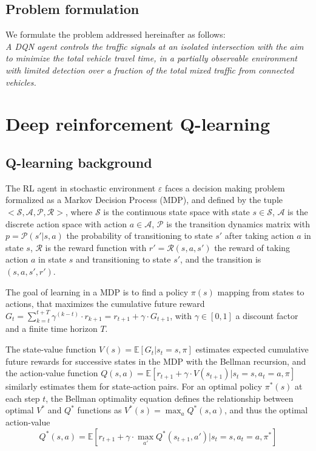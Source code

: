 \documentclass[journal]{IEEEtran}
\begin{document}
\subsection{Problem formulation}
We formulate the problem addressed hereinafter as follows: \\
\textit{A DQN agent controls the traffic signals at an isolated intersection with the aim to minimize the total vehicle travel time, in a partially observable environment with limited detection over a fraction of the total mixed traffic from connected vehicles.}

\section{Deep reinforcement Q-learning}
\label{sec:dqn}

\subsection{Q-learning background}
The RL agent in stochastic environment $\varepsilon$ faces a decision making problem formalized as a Markov Decision Process (MDP), and defined by the tuple $<\mathcal{S},\mathcal{A},\mathcal{P},\mathcal{R}>$, where $\mathcal{S}$ is the continuous state space with state $s \in \mathcal{S}$, $\mathcal{A}$ is the discrete action space with action $a \in \mathcal{A}$, $\mathcal{P}$ is the transition dynamics matrix with $p=\mathcal{P}(s'|s,a)$ the probability of transitioning to state $s'$ after taking action $a$ in state $s$, $\mathcal{R}$ is the reward function with $r'=\mathcal{R}(s,a,s')$ the reward of taking action $a$ in state $s$ and transitioning to state $s'$, and the transition is $(s,a,s',r')$.

The goal of learning in a MDP is to find a policy $\pi(s)$ mapping from states to actions, that maximizes the cumulative future reward $G_t = \sum_{k=t}^{t+T} \gamma^{(k-t)} \cdot r_{k+1} = r_{t+1} + \gamma \cdot G_{t+1}$, with $\gamma \in [0,1]$ a discount factor and a finite time horizon $T$.
    
The state-value function $V(s) = \mathbb{E}[G_{t} |s_t=s, \pi]$ estimates expected cumulative future rewards for successive states in the MDP with the Bellman recursion, and the action-value function $Q(s,a)= \mathbb{E}[r_{t+1} + \gamma \cdot V(s_{t+1}) |s_t=s, a_t=a, \pi]$ similarly estimates them for state-action pairs. For an optimal policy $\pi^*(s)$ at each step $t$, the Bellman optimality equation defines the relationship between optimal $V^*$ and $Q^*$ functions as $V^*(s) = \max_a Q^*(s,a)$, and thus the optimal action-value
\[ Q^*(s,a) = \mathbb{E}[r_{t+1} + \gamma \cdot \max_{a'}Q^*(s_{t+1},a')|s_t=s,a_t=a,\pi^*] \]
\end{document}
